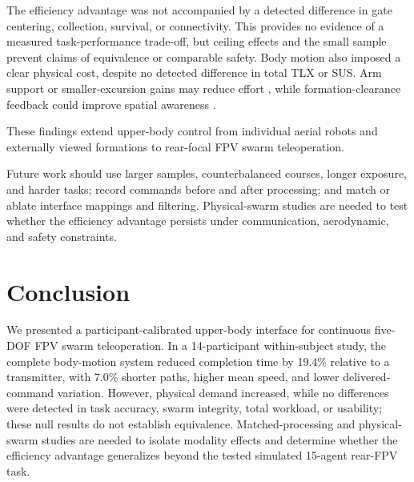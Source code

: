 The efficiency advantage was not accompanied by a detected difference in gate
centering, collection, survival, or connectivity. This provides no evidence of
a measured task-performance trade-off, but ceiling effects and the small sample
prevent claims of equivalence or comparable safety. Body motion also imposed a
clear physical cost, despite no detected difference in total TLX or SUS.
Arm support or smaller-excursion gains may reduce effort
\cite{rognon2018flyjacket}, while formation-clearance feedback could improve
spatial awareness \cite{tsykunov2019swarmtouch}.

These findings extend upper-body control from individual aerial robots and
externally viewed formations
\cite{rognon2018flyjacket,miehlbradt2018datadriven,
macchini2024datadriven,macchini2021personalized}
to rear-focal FPV swarm teleoperation.

Future work should use larger samples, counterbalanced courses,
longer exposure, and harder tasks; record commands before and after processing;
and match or ablate interface mappings and filtering. Physical-swarm studies
are needed to test whether the efficiency advantage persists under
communication, aerodynamic, and safety constraints.

\section{Conclusion}


We presented a participant-calibrated upper-body interface for continuous five-DOF FPV swarm teleoperation. In a 14-participant within-subject study, the complete body-motion system reduced completion time by 19.4\% relative to a
transmitter, with 7.0\% shorter paths, higher mean speed, and lower
delivered-command variation. However, physical demand increased, while no differences were detected in task accuracy, swarm integrity, total workload, or usability; these null results do not establish equivalence. Matched-processing and physical-swarm studies are needed to isolate modality effects and determine whether the efficiency advantage generalizes beyond the tested simulated 15-agent rear-FPV task.






